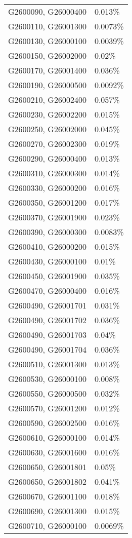 \begin{longtable}[]{@{}ll@{}}
G2600090, G26000400 & 0.013\% \\
G2600110, G26001300 & 0.0073\% \\
G2600130, G26000100 & 0.0039\% \\
G2600150, G26002000 & 0.02\% \\
G2600170, G26001400 & 0.036\% \\
G2600190, G26000500 & 0.0092\% \\
G2600210, G26002400 & 0.057\% \\
G2600230, G26002200 & 0.015\% \\
G2600250, G26002000 & 0.045\% \\
G2600270, G26002300 & 0.019\% \\
G2600290, G26000400 & 0.013\% \\
G2600310, G26000300 & 0.014\% \\
G2600330, G26000200 & 0.016\% \\
G2600350, G26001200 & 0.017\% \\
G2600370, G26001900 & 0.023\% \\
G2600390, G26000300 & 0.0083\% \\
G2600410, G26000200 & 0.015\% \\
G2600430, G26000100 & 0.01\% \\
G2600450, G26001900 & 0.035\% \\
G2600470, G26000400 & 0.016\% \\
G2600490, G26001701 & 0.031\% \\
G2600490, G26001702 & 0.036\% \\
G2600490, G26001703 & 0.04\% \\
G2600490, G26001704 & 0.036\% \\
G2600510, G26001300 & 0.013\% \\
G2600530, G26000100 & 0.008\% \\
G2600550, G26000500 & 0.032\% \\
G2600570, G26001200 & 0.012\% \\
G2600590, G26002500 & 0.016\% \\
G2600610, G26000100 & 0.014\% \\
G2600630, G26001600 & 0.016\% \\
G2600650, G26001801 & 0.05\% \\
G2600650, G26001802 & 0.041\% \\
G2600670, G26001100 & 0.018\% \\
G2600690, G26001300 & 0.015\% \\
G2600710, G26000100 & 0.0069\% \\

\end{longtable}
